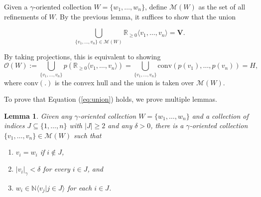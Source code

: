 \documentclass[notitlepage, 10pt]{article}
\theoremstyle{defin}
\theoremstyle{theo}
\newtheorem{lem}{Lemma}[defn]
\theoremstyle{rema}
\newcommand{\R}{\mathbb{R}}
\newcommand{\N}{\mathbb{N}}
\newcommand{\cM}{\mathcal{M}}
\newcommand{\cO}{\mathcal{O}}
\newcommand{\cv}{\mathrm{conv}}
\begin{document}
Given a $\gamma$-oriented collection $W=\{w_1,\ldots,w_n\}$, define $\cM(W)$ as the set of all refinements of $W$. By the previous lemma, it suffices to show that the union

\begin{equation}\label{eq:union}\tag{6.1}
    \bigcup_{\{v_1,\ldots,v_n\}\in \cM(W) } \R_{\geq 0}\langle v_1,\ldots,v_n\rangle = \mathbf{V}.
\end{equation}

By taking projections, this is equivalent to showing
    $$\cO(W) := \bigcup_{\{v_1,\ldots,v_n\}} p(\R_{\geq 0}\langle v_1,\ldots,v_n\rangle) = \bigcup_{\{v_1,\ldots,v_n\}}\cv (p(v_1),\ldots,p(v_n)) = H, $$
where $\cv(.)$ is the convex hull and the union is taken over $\cM(W).$

To prove that Equation (\ref{eq:union}) holds, we prove multiple lemmas.

\begin{lem}
    \label{lem4}
    Given any $\gamma$-oriented collection $W=\{w_1,\ldots,w_n\}$ and a collection of indices $J\subseteq \{1,\ldots, n\}$ with $|J|\geq 2$ and any $\delta>0$, there is a $\gamma$-oriented collection $\{v_1,\ldots, v_n\}\in \cM(W)$ such that
    \begin{enumerate}
        \item $v_i=w_i$ if $i\notin J$,
        \item $|v_i|_\gamma < \delta $ for every $i\in J$, and
        \item $w_i \in \N\langle v_j | j\in J\rangle$ for each $i\in J$.
    \end{enumerate}
\end{lem}
\end{document}
